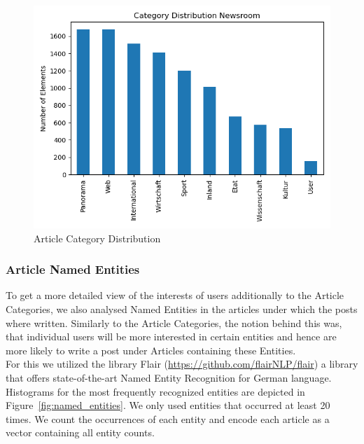 \documentclass[acmsmall]{acmart}
\begin{document}
\begin{figure}[H]
\includegraphics[width=.5\linewidth]{assets/Category_Distribution_Newsroom.png}
\caption{Article Category Distribution}
\label{fig:article_categories}
\end{figure}


\subsubsection{Article Named Entities}
To get a more detailed view of the interests of users additionally to the Article Categories, we also analysed Named Entities in the articles under which the posts where written. Similarly to the Article Categories, the notion behind this was, that individual users will be more interested in certain entities and hence are more likely to write a post under Articles containing these Entities. \\
For this we utilized the library Flair (\url{https://github.com/flairNLP/flair}) a library that offers state-of-the-art Named Entity Recognition for German language. Histograms for the most frequently recognized entities are depicted in Figure~\ref{fig:named_entities}. We only used entities that occurred at least 20 times. We count the occurrences of each entity and encode each article as a vector containing all entity counts. 
\end{document}
